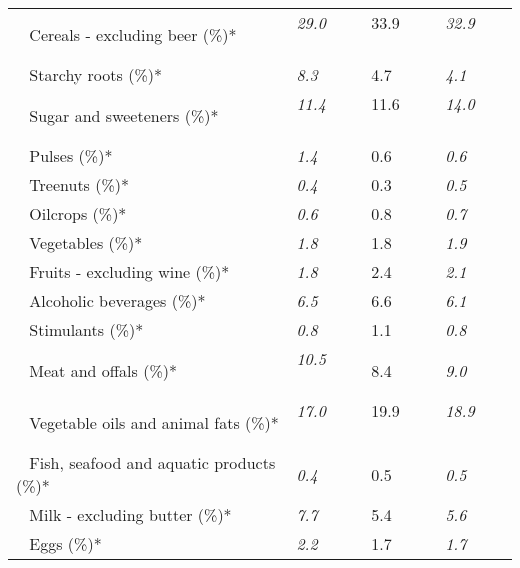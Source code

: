 \begin{tabular}{L{3.9cm} R{1cm} R{1cm} R{1cm}}
	 ~ Cereals - excluding beer (\%)* & \textit{29.0} ~ \ \ & 33.9 ~ \ \ & \textit{32.9} ~ \ \ \\ 
	 ~ Starchy roots (\%)* & \textit{8.3} ~ \ \ & 4.7 ~ \ \ & \textit{4.1} ~ \ \ \\ 
	 ~ Sugar and sweeteners (\%)* & \textit{11.4} ~ \ \ & 11.6 ~ \ \ & \textit{14.0} ~ \ \ \\ 
	 ~ Pulses (\%)* & \textit{1.4} ~ \ \ & 0.6 ~ \ \ & \textit{0.6} ~ \ \ \\ 
	 ~ Treenuts (\%)* & \textit{0.4} ~ \ \ & 0.3 ~ \ \ & \textit{0.5} ~ \ \ \\ 
	 ~ Oilcrops (\%)* & \textit{0.6} ~ \ \ & 0.8 ~ \ \ & \textit{0.7} ~ \ \ \\ 
	 ~ Vegetables (\%)* & \textit{1.8} ~ \ \ & 1.8 ~ \ \ & \textit{1.9} ~ \ \ \\ 
	 ~ Fruits - excluding wine (\%)* & \textit{1.8} ~ \ \ & 2.4 ~ \ \ & \textit{2.1} ~ \ \ \\ 
	 ~ Alcoholic beverages (\%)* & \textit{6.5} ~ \ \ & 6.6 ~ \ \ & \textit{6.1} ~ \ \ \\ 
	 ~ Stimulants (\%)* & \textit{0.8} ~ \ \ & 1.1 ~ \ \ & \textit{0.8} ~ \ \ \\ 
	 ~ Meat and offals (\%)* & \textit{10.5} ~ \ \ & 8.4 ~ \ \ & \textit{9.0} ~ \ \ \\ 
	 ~ Vegetable oils and animal fats (\%)* & \textit{17.0} ~ \ \ & 19.9 ~ \ \ & \textit{18.9} ~ \ \ \\ 
	 ~ Fish, seafood and aquatic products (\%)* & \textit{0.4} ~ \ \ & 0.5 ~ \ \ & \textit{0.5} ~ \ \ \\ 
	 ~ Milk - excluding butter (\%)* & \textit{7.7} ~ \ \ & 5.4 ~ \ \ & \textit{5.6} ~ \ \ \\ 
	 ~ Eggs (\%)* & \textit{2.2} ~ \ \ & 1.7 ~ \ \ & \textit{1.7} ~ \ \ \\ 
       \toprule
      \end{tabular}
      \clearpage
{}
